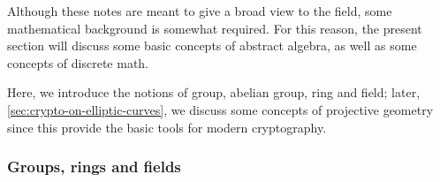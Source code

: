 \documentclass{subfiles}
\begin{document}
    Although these notes are meant to give a broad view to the field,
        some mathematical background is somewhat required.
        For this reason, the present section will discuss some basic concepts of abstract algebra,
        as well as some concepts of discrete math.

    Here, we introduce the notions of group, abelian group, ring and field;
        later, \cref{sec:crypto-on-elliptic-curves},
        we discuss some concepts of projective geometry since this provide the basic tools for 
        modern cryptography.

    \subsubsection{Groups, rings and fields}
    
\end{document}
